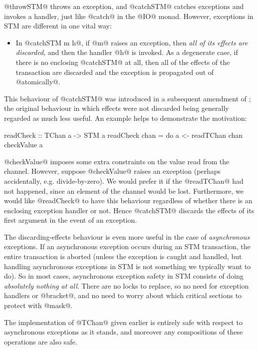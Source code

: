 \noindent @throwSTM@ throws an exception, and @catchSTM@ catches
exceptions and invokes a handler, just like @catch@ in the @IO@ monad.
However, exceptions in STM are different in one vital way:

\begin{itemize}
\item In @catchSTM m h@, if @m@ raises an exception, then \emph{all of
  its effects are discarded}, and then the handler @h@ is invoked.  As
  a degenerate case, if there is no enclosing @catchSTM@ at all, then
  all of the effects of the transaction are discarded and the
  exception is propagated out of @atomically@.
\end{itemize}

\noindent This behaviour of @catchSTM@ was introduced in a subsequent
amendment of \citet{stm}; the original behaviour in which effects were
not discarded being generally regarded as much less useful.  An
example helps to demonstrate the motivation:

\begin{haskell}
readCheck :: TChan a -> STM a
readCheck chan = do
  a <- readTChan chan
  checkValue a
\end{haskell}

\noindent @checkValue@ imposes some extra constraints on the value
read from the channel.  However, suppose @checkValue@ raises an
exception (perhaps accidentally, e.g. divide-by-zero).  We would
prefer it if the @readTChan@ had not happened, since an element of the
channel would be lost.  Furthermore, we would like @readCheck@ to have
this behaviour regardless of whether there is an enclosing exception
handler or not.  Hence @catchSTM@ discards the effects of its first
argument in the event of an exception.

The discarding-effects behaviour is even more useful in the case of
\emph{asynchronous} exceptions.  If an asynchronous exception occurs
during an STM transaction, the entire transaction is aborted (unless
the exception is caught and handled, but handling asynchronous
exceptions in STM is not something we typically want to do).  So in
most cases, asynchronous exception safety in STM consists of doing
\emph{absolutely nothing at all}.  There are no locks to replace, so
no need for exception handlers or @bracket@, and no need to worry
about which critical sections to protect with @mask@.

The implementation of @TChan@ given earlier is entirely safe with
respect to asynchronous exceptions as it stands, and moreover any
compositions of these operations are also safe.

